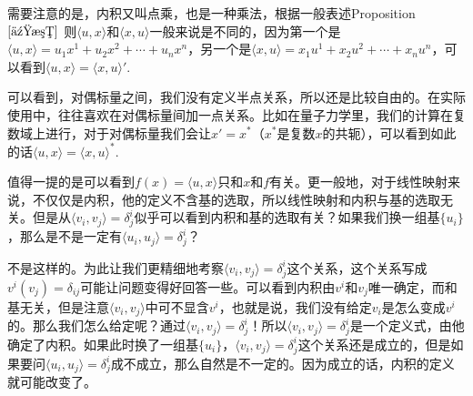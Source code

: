 \documentclass[11pt,a4paper,openany]{book}%
\theoremstyle{plain}%
\newcommand{\pref}[1]{{\rm Proposition} $\ref{#1}$}
\begin{document}
需要注意的是，内积又叫点乘，也是一种乘法，根据一般表述\pref{乘法} 则$\langle u,x \rangle$和$\langle x,u \rangle$一般来说是不同的，因为第一个是$\langle u,x \rangle=u_1x^1+u_2x^2+\cdots+u_nx^n$，另一个是$\langle x,u \rangle=x_1u^1+x_2u^2+\cdots+x_nu^n$，可以看到$\langle u,x \rangle=\langle x,u \rangle'$.

可以看到，对偶标量之间，我们没有定义半点关系，所以还是比较自由的。在实际使用中，往往喜欢在对偶标量间加一点关系。比如在量子力学里，我们的计算在复数域上进行，对于对偶标量我们会让$x'=x^*$（$x^*$是复数$x$的共轭），可以看到如此的话$\langle u,x \rangle=\langle x,u \rangle^*$.

值得一提的是可以看到$f(x)=\langle u,x \rangle$只和$x$和$f$有关。更一般地，对于线性映射来说，不仅仅是内积，他的定义不含基的选取，所以线性映射和内积与基的选取无关。但是从$\langle v_i,v_j\rangle=\delta_{j}^i$似乎可以看到内积和基的选取有关？如果我们换一组基$\{u_i\}$，那么是不是一定有$\langle u_i,u_j\rangle=\delta_{j}^i$？

不是这样的。为此让我们更精细地考察$\langle v_i,v_j\rangle=\delta_{j}^i$这个关系，这个关系写成$v^i(v_j)=\delta_{ij}$可能让问题变得好回答一些。可以看到内积由$v^i$和$v_j$唯一确定，而和基无关，但是注意$\langle v_i,v_j\rangle$中可不显含$v^i$，也就是说，我们没有给定$v_i$是怎么变成$v^i$的。那么我们怎么给定呢？通过$\langle v_i,v_j\rangle=\delta_{j}^i$！所以$\langle v_i,v_j\rangle=\delta_{j}^i$是一个定义式，由他确定了内积。如果此时换了一组基$\{u_i\}$，$\langle v_i,v_j\rangle=\delta_{j}^i$这个关系还是成立的，但是如果要问$\langle u_i,u_j\rangle=\delta_{j}^i$成不成立，那么自然是不一定的。因为成立的话，内积的定义就可能改变了。
\end{document}
